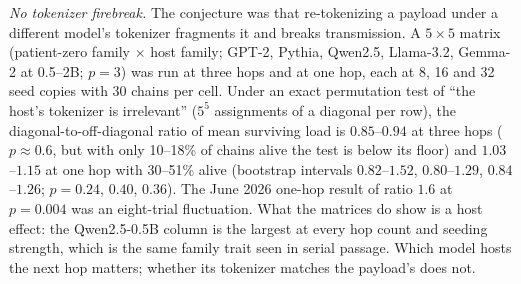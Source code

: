 \documentclass[11pt]{article}
\theoremstyle{plain}
\theoremstyle{definition}
\theoremstyle{remark}
\begin{document}
\emph{No tokenizer firebreak.} The conjecture was that re-tokenizing a payload under a different
model's tokenizer fragments it and breaks transmission. A $5\times5$ matrix (patient-zero family
$\times$ host family; GPT-2, Pythia, Qwen2.5, Llama-3.2, Gemma-2 at 0.5--2B; $p{=}3$) was run
at three hops and at one hop, each at 8, 16 and 32 seed copies with 30 chains per cell. Under
an exact permutation test of ``the host's tokenizer is irrelevant'' ($5^5$ assignments of a
diagonal per row), the diagonal-to-off-diagonal ratio of mean surviving load is $0.85$--$0.94$
at three hops ($p\approx0.6$, but with only 10--18\% of chains alive the test is below its
floor) and $1.03$--$1.15$ at one hop with 30--51\% alive (bootstrap intervals $0.82$--$1.52$,
$0.80$--$1.29$, $0.84$--$1.26$; $p = 0.24$, $0.40$, $0.36$). The June 2026 one-hop result of
ratio $1.6$ at $p{=}0.004$ was an eight-trial fluctuation. What the matrices do show is a host
effect: the Qwen2.5-0.5B column is the largest at every hop count and seeding strength, which is
the same family trait seen in serial passage. Which model hosts the next hop matters; whether
its tokenizer matches the payload's does not.

\end{document}
